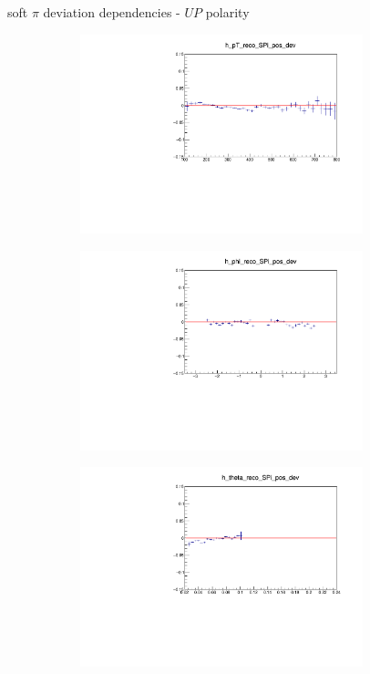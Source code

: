\documentclass[11pt]{beamer}
\begin{document}
\begin{frame}{soft $\pi$ deviation dependencies - $UP$ polarity}
\begin{figure}
\begin{subfigure}{0.45\textwidth}
\includegraphics[width=0.9\textwidth]{sec/up_pdf/deviation/h_pt_reco_SPi_pos_dev.pdf}
\end{subfigure}
\begin{subfigure}{0.45\textwidth}
\includegraphics[width=0.9\textwidth]{sec/up_pdf/deviation/h_phi_reco_SPi_pos_dev.pdf}
\end{subfigure}
\begin{subfigure}{0.45\textwidth}
\includegraphics[width=0.9\textwidth]{sec/up_pdf/deviation/h_theta_reco_SPi_pos_dev.pdf}

\end{subfigure}
\end{figure}
\end{frame}
\end{document}
